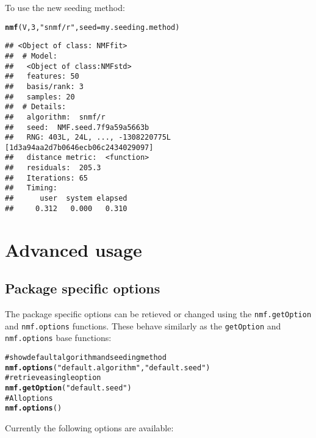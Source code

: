 \documentclass[a4paper]{article}\usepackage{graphicx, color}
\makeatletter
\newcommand{\hlfunctioncall}[1]{\textcolor[rgb]{0.501960784313725,0,0.329411764705882}{\textbf{#1}}}%
\newcommand{\hlstring}[1]{\textcolor[rgb]{0.6,0.6,1}{#1}}%
\newcommand{\hlcomment}[1]{\textcolor[rgb]{0.180392156862745,0.6,0.341176470588235}{#1}}%
\newenvironment{kframe}{%
 \def\at@end@of@kframe{}%
 \ifinner\ifhmode%
  \def\at@end@of@kframe{\end{minipage}}%
  \begin{minipage}{\columnwidth}%
 \fi\fi%
 \def\FrameCommand##1{\hskip\@totalleftmargin \hskip-\fboxsep
 \colorbox{shadecolor}{##1}\hskip-\fboxsep
     \hskip-\linewidth \hskip-\@totalleftmargin \hskip\columnwidth}%
 \MakeFramed {\advance\hsize-\width
   \@totalleftmargin\z@ \linewidth\hsize
   \@setminipage}}%
 {\par\unskip\endMakeFramed%
 \at@end@of@kframe}
\newenvironment{knitrout}{}{} %
\let\code=\texttt
\makeatother
\begin{document}
To use the new seeding method:
\begin{knitrout}
\color{fgcolor}\begin{kframe}
\begin{alltt}
\hlfunctioncall{nmf}(V, 3, \hlstring{"snmf/r"}, seed = my.seeding.method)
\end{alltt}
\begin{verbatim}
## <Object of class: NMFfit>
##  # Model:
##   <Object of class:NMFstd>
##   features: 50 
##   basis/rank: 3 
##   samples: 20 
##  # Details:
##   algorithm:  snmf/r 
##   seed:  NMF.seed.7f9a59a5663b 
##   RNG: 403L, 24L, ..., -1308220775L [1d3a94aa2d7b0646ecb06c2434029097]
##   distance metric:  <function> 
##   residuals:  205.3 
##   Iterations: 65 
##   Timing:
##      user  system elapsed 
##     0.312   0.000   0.310
\end{verbatim}
\end{kframe}
\end{knitrout}


\section{Advanced usage}

\subsection{Package specific options}
The package specific options can be retieved or changed using the \code{nmf.getOption} and \code{nmf.options} functions. 
These behave similarly as the \code{getOption} and \code{nmf.options} base functions:

\begin{knitrout}
\color{fgcolor}\begin{kframe}
\begin{alltt}
\hlcomment{# show default algorithm and seeding method}
\hlfunctioncall{nmf.options}(\hlstring{"default.algorithm"}, \hlstring{"default.seed"})
\hlcomment{# retrieve a single option}
\hlfunctioncall{nmf.getOption}(\hlstring{"default.seed"})
\hlcomment{# All options}
\hlfunctioncall{nmf.options}()
\end{alltt}
\end{kframe}
\end{knitrout}


Currently the following options are available:
\end{document}
